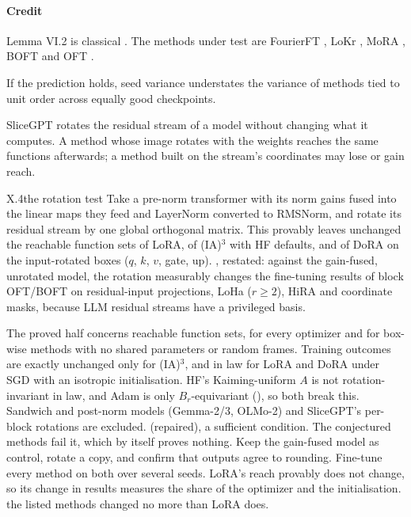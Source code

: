 \paragraph{Credit}
Lemma VI.2 is classical \citep{xsussmann1992uniqueness,xchen1993geometry,xgodfrey2022symmetries}. The methods under
test are FourierFT \citep{gao2024parameter}, LoKr \citep{yeh2023navigating}, MoRA \citep{jiang2024mora}, BOFT
\citep{liu2023parameter} and OFT \citep{qiu2023controlling}.

\begin{explains}
If the prediction holds, seed variance understates the variance of methods tied to unit order across equally good
checkpoints.
\end{explains}

SliceGPT rotates the residual stream of a model without changing what it computes. A method whose image rotates with the
weights reaches the same functions afterwards; a method built on the stream's coordinates may lose or gain reach.

\begin{prediction}{X.4}{the rotation test}
Take a pre-norm transformer with its norm gains fused into the linear maps they feed and LayerNorm converted to RMSNorm,
and rotate its residual stream by one global orthogonal matrix. This provably leaves unchanged the reachable function
sets of LoRA, of (IA)$^3$ with HF defaults, and of DoRA on the input-rotated boxes ($q$, $k$, $v$, gate, up).
, restated: against the gain-fused, unrotated model, the rotation measurably changes the
fine-tuning results of block OFT/BOFT on residual-input projections, LoHa ($r\ge2$), HiRA and coordinate masks, because
LLM residual streams have a privileged basis.
\begin{predmeta}
   The proved half concerns reachable function sets, for every optimizer and for box-wise methods with
    no shared parameters or random frames. Training outcomes are exactly unchanged only for (IA)$^3$, and in law for
    LoRA and DoRA under SGD with an isotropic initialisation. HF's Kaiming-uniform $A$ is not rotation-invariant in law,
    and Adam is only $B_r$-equivariant (), so both break this. Sandwich and post-norm models
    (Gemma-2/3, OLMo-2) and SliceGPT's per-block rotations are excluded.
    (repaired), a sufficient condition. The conjectured methods fail it,
    which by itself proves nothing.
   Keep the gain-fused model as control, rotate a copy, and confirm that outputs agree to rounding.
    Fine-tune every method on both over several seeds. LoRA's reach provably does not change, so its change in results
    measures the share of the optimizer and the initialisation.
   the listed methods changed no more than LoRA does.
\end{predmeta}
\end{prediction}

